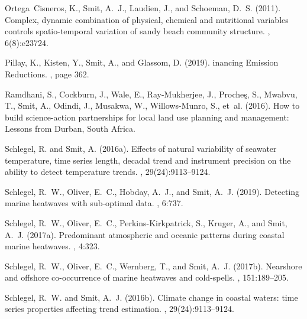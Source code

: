 \begin{thebibliography}{}
  Ortega~Cisneros, K., Smit, A.~J., Laudien, J., and Schoeman, D.~S. (2011).
  \newblock Complex, dynamic combination of physical, chemical and nutritional
    variables controls spatio-temporal variation of sandy beach community
    structure.
  , 6(8):e23724.
  
  Pillay, K., Kisten, Y., Smit, A., and Glassom, D. (2019).
  inancing {E}mission {R}eductions.
  , page 362.
  
  Ramdhani, S., Cockburn, J., Wale, E., Ray-Mukherjee, J., Proche{\c{s}}, S.,
    Mwabvu, T., Smit, A., Odindi, J., Musakwa, W., Willows-Munro, S., et~al.
    (2016).
  \newblock How to build science-action partnerships for local land use planning
    and management: Lessons from {D}urban, {S}outh {A}frica.
  
  Schlegel, R. and Smit, A. (2016a).
  \newblock Effects of natural variability of seawater temperature, time series
    length, decadal trend and instrument precision on the ability to detect
    temperature trends.
  , 29(24):9113--9124.
  
  Schlegel, R.~W., Oliver, E.~C., Hobday, A.~J., and Smit, A.~J. (2019).
  \newblock Detecting marine heatwaves with sub-optimal data.
  , 6:737.
  
  Schlegel, R.~W., Oliver, E.~C., Perkins-Kirkpatrick, S., Kruger, A., and Smit,
    A.~J. (2017a).
  \newblock Predominant atmospheric and oceanic patterns during coastal marine
    heatwaves.
  , 4:323.
  
  Schlegel, R.~W., Oliver, E.~C., Wernberg, T., and Smit, A.~J. (2017b).
  \newblock Nearshore and offshore co-occurrence of marine heatwaves and
    cold-spells.
  , 151:189--205.
  
  Schlegel, R.~W. and Smit, A.~J. (2016b).
  \newblock Climate change in coastal waters: time series properties affecting
    trend estimation.
  , 29(24):9113--9124.
  

\end{thebibliography}
